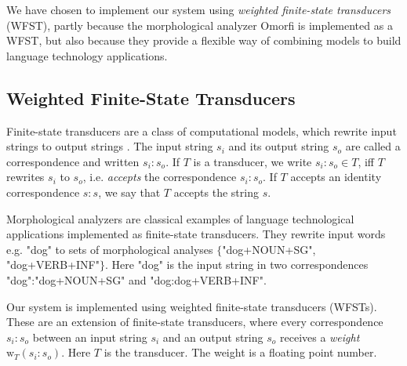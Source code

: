 \documentclass[a4paper,conference]{IEEEtran}
\begin{document}
We have chosen to implement our system using {\it weighted finite-state
transducers} (WFST), partly because the morphological analyzer Omorfi is
implemented as a WFST, but also because they provide a flexible way of
combining models to build language technology applications.

\subsection{Weighted Finite-State Transducers}


Finite-state transducers are a class of computational models, which
rewrite input strings to output strings \cite{beesley/2003}. The input
string $s_i$ and its output string $s_o$ are called a correspondence
and written $s_i\mathrm{:}s_o$. If $T$ is a transducer, we write
$s_i\mathrm{:}s_o \in T$, iff $T$ rewrites $s_i$ to $s_o$, i.e. {\it
  accepts} the correspondence $s_i\mathrm{:}s_o$. If $T$ accepts an
identity correspondence $s\mathrm{:}s$, we say that $T$ accepts the
string $s$.

Morphological analyzers are classical examples of language
technological applications implemented as finite-state
transducers. They rewrite input words e.g. "dog" to sets of
morphological analyses $\{$"dog+NOUN+SG", "dog+VERB+INF"$\}$. Here
"dog" is the input string in two correspondences "dog":"dog+NOUN+SG"
and "dog:dog+VERB+INF".

Our system is implemented using weighted finite-state transducers
(WFSTs). These are an extension of finite-state transducers, where
every correspondence $s_i\mathrm{:}s_o$ between an input string $s_i$
and an output string $s_o$ receives a {\it weight} $\mathrm{w}_T(s_i\mathrm{:}s_o)$. Here $T$ is the transducer. The weight is a floating point number. 
\end{document}
